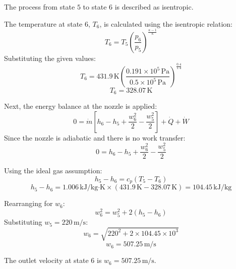 The process from state \( 5 \) to state \( 6 \) is described as isentropic.  

The temperature at state \( 6 \), \( T_6 \), is calculated using the isentropic relation:  
\[
T_6 = T_5 \left( \frac{p_6}{p_5} \right)^{\frac{\kappa - 1}{\kappa}}
\]  
Substituting the given values:  
\[
T_6 = 431.9 \, \text{K} \left( \frac{0.191 \times 10^5 \, \text{Pa}}{0.5 \times 10^5 \, \text{Pa}} \right)^{\frac{0.4}{1.4}}
\]  
\[
T_6 = 328.07 \, \text{K}
\]  

Next, the energy balance at the nozzle is applied:  
\[
0 = \dot{m} \left[ h_6 - h_5 + \frac{w_6^2}{2} - \frac{w_5^2}{2} \right] + \dot{Q} + \dot{W}
\]  
Since the nozzle is adiabatic and there is no work transfer:  
\[
0 = h_6 - h_5 + \frac{w_6^2}{2} - \frac{w_5^2}{2}
\]  

Using the ideal gas assumption:  
\[
h_5 - h_6 = c_p (T_5 - T_6)
\]  
\[
h_5 - h_6 = 1.006 \, \text{kJ/kg·K} \times (431.9 \, \text{K} - 328.07 \, \text{K}) = 104.45 \, \text{kJ/kg}
\]  

Rearranging for \( w_6 \):  
\[
w_6^2 = w_5^2 + 2 (h_5 - h_6)
\]  
Substituting \( w_5 = 220 \, \text{m/s} \):  
\[
w_6 = \sqrt{220^2 + 2 \times 104.45 \times 10^3}
\]  
\[
w_6 = 507.25 \, \text{m/s}
\]  

The outlet velocity at state \( 6 \) is \( w_6 = 507.25 \, \text{m/s} \).